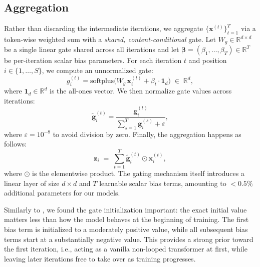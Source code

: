 \subsection{Aggregation}
\label{sec:method:agg}

Rather than discarding the intermediate iterations, we aggregate
$\{\mathbf{x}^{(t)}\}_{t=1}^{T}$ via a token-wise weighted sum with a
\emph{shared, content-conditional} gate. %
Let $W_g \in \mathbb{R}^{d \times d}$
be a single linear gate shared across all iterations and let
$\boldsymbol{\beta} = (\beta_1, \dots, \beta_T) \in \mathbb{R}^{T}$
be per-iteration scalar bias parameters. For each iteration $t$ and position
$i \in \{1,\dots,S\}$, we compute an unnormalized gate:
\begin{equation}
  g_i^{(t)} = \text{softplus}\!\Big(W_g\, \mathbf{x}_i^{(t)} + \beta_t \cdot \mathbf{1}_d\Big)
  \;\in\; \mathbb{R}^d,
\end{equation}
where $\mathbf{1}_d \in \mathbb{R}^d$ is the all-ones vector. We then normalize gate values across iterations:
\begin{equation}
  \tilde{\mathbf{g}}^{(t)}_{i} {=} \frac{\mathbf{g}^{(t)}_{i}}{\sum_{s=1}^{T} \mathbf{g}^{(s)}_{i} + \varepsilon},
\end{equation}
where $\varepsilon = 10^{-8}$ to avoid division by zero. 
Finally, the aggregation happens as follows:
\begin{equation}
    \mathbf{z}_{i} \;=\; \sum_{t=1}^{T} \tilde{\mathbf{g}}^{(t)}_{i} \odot \mathbf{x}^{(t)}_{i},
  \label{eq:ws}
\end{equation}
where $\odot$ is the elementwise product. 
The gating mechanism itself introduces a linear layer of size $d {\times} d$ and $T$ learnable scalar bias terms, amounting to ${<}0.5\%$ additional parameters for our models.

Similarly to \citet{frey2026adaptive}, we found the gate initialization important: 
the exact initial value matters less than how the model behaves at the beginning of training.
The first bias term is initialized to a moderately positive value, while all subsequent bias terms start at a substantially negative value. This provides a strong prior toward the first iteration, i.e., acting as a vanilla non-looped transformer at first, while leaving later iterations free to take over as training progresses.











